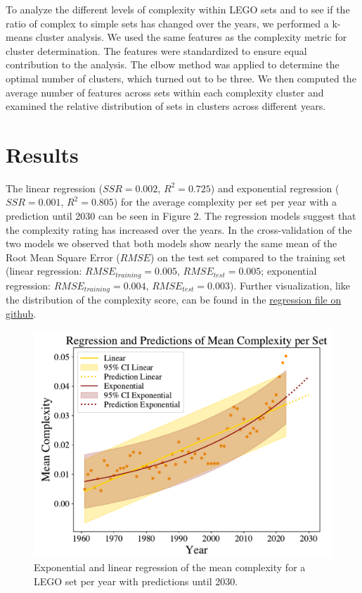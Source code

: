 \documentclass{article}
\theoremstyle{plain}
\theoremstyle{definition}
\theoremstyle{remark}
\begin{document}
To analyze the different levels of complexity within LEGO sets and to see if the ratio of complex to simple sets has changed over the years, we performed a k-means cluster analysis. We used the same features as the complexity metric for cluster determination. The features were standardized to ensure equal contribution to the analysis. The elbow method was applied to determine the optimal number of clusters, which turned out to be three. We then computed the average number of features across sets within each complexity cluster and examined the relative distribution of sets in clusters across different years.

\section{Results}\label{sec:results}
The linear regression ($SSR = 0.002$, $R^2= 0.725$) and exponential regression ($SSR = 0.001$, $R^2= 0.805$) for the average complexity per set per year with a prediction until 2030 can be seen in Figure 2. The regression models suggest that the complexity rating has increased over the years. In the cross-validation of the two models we observed that both models show nearly the same mean of the Root Mean Square Error ($RMSE$) on the test set compared to the training set (linear regression: $RMSE_{training} = 0.005$, $RMSE_{test} = 0.005$; exponential regression: $RMSE_{training} = 0.004$, $RMSE_{test} = 0.003$). Further visualization, like the distribution of the complexity score, can be found in the \href{https://github.com/eddiebeach99/Data_Literacy/blob/main/Analysis/complexity_regression.ipynb}{regression file on github}.
\begin{figure}[H]
\vskip 0.2in
 \begin{center}
 \centerline{\includegraphics[width=\columnwidth]{../Images/Regressions.pdf}}
\caption{Exponential and linear regression of the mean complexity for a LEGO set per year with predictions until 2030.}
\label{icml-historical}
 \end{center}
\vskip -0.2in
\end{figure}
\end{document}
